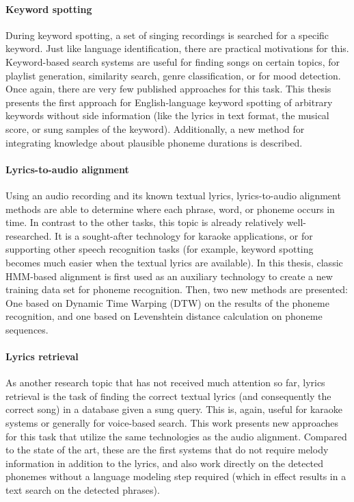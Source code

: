 \paragraph{Keyword spotting}
During keyword spotting, a set of singing recordings is searched for a specific keyword. Just like language identification, there are practical motivations for this. Keyword-based search systems are useful for finding songs on certain topics, for playlist generation, similarity search, genre classification, or for mood detection.
Once again, there are very few published approaches for this task. This thesis presents the first approach for English-language keyword spotting of arbitrary keywords without side information (like the lyrics in text format, the musical score, or sung samples of the keyword). Additionally, a new method for integrating knowledge about plausible phoneme durations is described.

\paragraph{Lyrics-to-audio alignment}
Using an audio recording and its known textual lyrics, lyrics-to-audio alignment methods are able to determine where each phrase, word, or phoneme occurs in time. In contrast to the other tasks, this topic is already relatively well-researched. It is a sought-after technology for karaoke applications, or for supporting other speech recognition tasks (for example, keyword spotting becomes much easier when the textual lyrics are available).
In this thesis, classic HMM-based alignment is first used as an auxiliary technology to create a new training data set for phoneme recognition. Then, two new methods are presented: One based on Dynamic Time Warping (DTW) on the results of the phoneme recognition, and one based on Levenshtein distance calculation on phoneme sequences.

\paragraph{Lyrics retrieval}
As another research topic that has not received much attention so far, lyrics retrieval is the task of finding the correct textual lyrics (and consequently the correct song) in a database given a sung query. This is, again, useful for karaoke systems or generally for voice-based search.
This work presents new approaches for this task that utilize the same technologies as the audio alignment. Compared to the state of the art, these are the first systems that do not require melody information in addition to the lyrics, and also work directly on the detected phonemes without a language modeling step required (which in effect results in a text search on the detected phrases).\\


